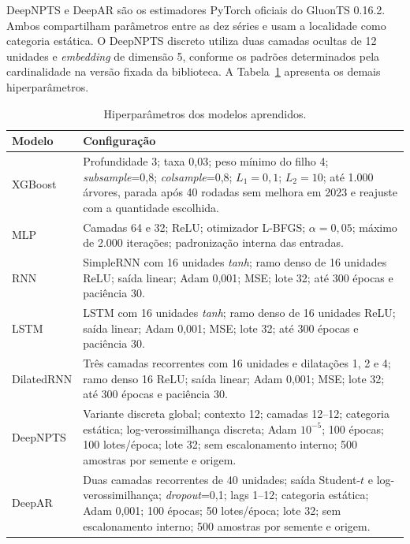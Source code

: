 \documentclass[10pt,conference,a4paper]{IEEEtran}
\begin{document}
DeepNPTS e DeepAR são os estimadores PyTorch oficiais do GluonTS 0.16.2. Ambos
compartilham parâmetros entre as dez séries e usam a localidade como categoria
estática. O DeepNPTS discreto utiliza duas camadas ocultas de 12 unidades e
\textit{embedding} de dimensão 5, conforme os padrões determinados pela
cardinalidade na versão fixada da biblioteca. A Tabela~\ref{tab:hiper} apresenta
os demais hiperparâmetros.

\begin{table}[!t]
\centering
\caption{Hiperparâmetros dos modelos aprendidos.}
\label{tab:hiper}
\small
\setlength{\tabcolsep}{4pt}
\renewcommand{\arraystretch}{1.06}
\begin{tabular}{>{\raggedright\arraybackslash}p{2.2cm}>{\raggedright\arraybackslash}p{14.8cm}}
\toprule
\textbf{Modelo} & \textbf{Configuração} \\
\midrule
XGBoost & Profundidade 3; taxa 0,03; peso mínimo do filho 4; \textit{subsample}=0,8; \textit{colsample}=0,8; $L_1=0,1$; $L_2=10$; até 1.000 árvores, parada após 40 rodadas sem melhora em 2023 e reajuste com a quantidade escolhida. \\
MLP & Camadas 64 e 32; ReLU; otimizador L-BFGS; $\alpha=0,05$; máximo de 2.000 iterações; padronização interna das entradas. \\
RNN & SimpleRNN com 16 unidades \textit{tanh}; ramo denso de 16 unidades ReLU; saída linear; Adam 0,001; MSE; lote 32; até 300 épocas e paciência 30. \\
LSTM & LSTM com 16 unidades \textit{tanh}; ramo denso de 16 unidades ReLU; saída linear; Adam 0,001; MSE; lote 32; até 300 épocas e paciência 30. \\
DilatedRNN & Três camadas recorrentes com 16 unidades e dilatações 1, 2 e 4; ramo denso 16 ReLU; saída linear; Adam 0,001; MSE; lote 32; até 300 épocas e paciência 30. \\
DeepNPTS & Variante discreta global; contexto 12; camadas 12--12; categoria estática; log-verossimilhança discreta; Adam $10^{-5}$; 100 épocas; 100 lotes/época; lote 32; sem escalonamento interno; 500 amostras por semente e origem. \\
DeepAR & Duas camadas recorrentes de 40 unidades; saída Student-$t$ e log-verossimilhança; \textit{dropout}=0,1; lags 1--12; categoria estática; Adam 0,001; 100 épocas; 50 lotes/época; lote 32; sem escalonamento interno; 500 amostras por semente e origem. \\
\bottomrule
\end{tabular}
\end{table}
\end{document}
